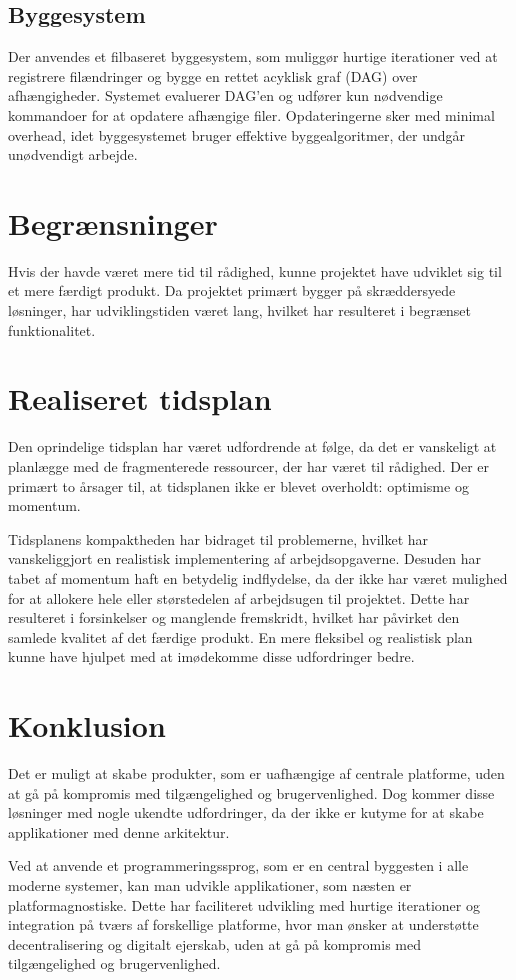 \documentclass{article}
\begin{document}
\subsection{Byggesystem}
Der anvendes et filbaseret byggesystem, som muliggør hurtige iterationer ved  
at registrere filændringer og bygge en rettet acyklisk graf (DAG) over  
afhængigheder. Systemet evaluerer DAG'en og udfører kun nødvendige  
kommandoer for at opdatere afhængige filer. Opdateringerne sker med minimal  
overhead, idet byggesystemet bruger effektive byggealgoritmer, der undgår  
unødvendigt arbejde.

\section{Begrænsninger}
Hvis der havde været mere tid til rådighed, kunne projektet have udviklet sig til et mere færdigt produkt.
Da projektet primært bygger på skræddersyede løsninger, har udviklingstiden været lang,
hvilket har resulteret i begrænset funktionalitet.

\section{Realiseret tidsplan}
Den oprindelige tidsplan har været udfordrende at følge, da det er
vanskeligt at planlægge med de fragmenterede ressourcer, der har været
til rådighed. Der er primært to årsager til, at tidsplanen ikke er
blevet overholdt: optimisme og momentum.

Tidsplanens kompaktheden har bidraget til problemerne, hvilket
har vanskeliggjort en realistisk implementering af arbejdsopgaverne. 
Desuden har tabet af momentum haft en betydelig indflydelse, da der
ikke har været mulighed for at allokere hele eller størstedelen af
arbejdsugen til projektet. Dette har resulteret i forsinkelser og
manglende fremskridt, hvilket har påvirket den samlede kvalitet af det
færdige produkt. En mere fleksibel og realistisk plan kunne have
hjulpet med at imødekomme disse udfordringer bedre.

\section{Konklusion}
Det er muligt at skabe produkter, som er uafhængige af centrale
platforme, uden at gå på kompromis med tilgængelighed og
brugervenlighed. Dog kommer disse løsninger med nogle ukendte
udfordringer, da der ikke er kutyme for at skabe applikationer med
denne arkitektur.

Ved at anvende et programmeringssprog, som er en central byggesten i
alle moderne systemer, kan man udvikle applikationer, som næsten er
platformagnostiske. Dette har faciliteret udvikling med hurtige
iterationer og integration på tværs af forskellige platforme, hvor man
ønsker at understøtte decentralisering og digitalt ejerskab,
uden at gå på kompromis med tilgængelighed og brugervenlighed.

\printbibliography[title={Referencer}]
\end{document}
